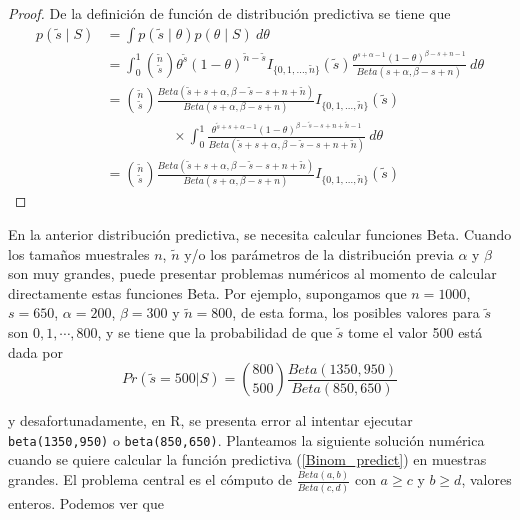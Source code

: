     \begin{proof}
    De la definici\'on de funci\'on de distribuci\'on predictiva se tiene que
    \begin{align*}
    p(\tilde{s} \mid S)&=\int p(\tilde{s} \mid \theta)p(\theta \mid S)\ d\theta\\
    &=\int_0^1 \binom{\tilde{n}}{\tilde{s}} \theta^{\tilde{s}}(1-\theta)^{\tilde{n}-\tilde{s}}I_{\{0,1,\ldots,\tilde{n}\}}(\tilde{s})
    \frac{\theta^{s+\alpha-1}(1-\theta)^{\beta-s+n-1}}{Beta(s+\alpha,\beta-s+n)}\ d\theta\\
    &=\binom{\tilde{n}}{\tilde{s}}\frac{Beta(\tilde{s}+s+\alpha,\beta-\tilde{s}-s+n+\tilde{n})}{Beta(s+\alpha,\beta-s+n)}I_{\{0,1,\ldots,\tilde{n}\}}(\tilde{s})\\
    & \hspace{2cm}\times
    \int_0^1\frac{\theta^{\tilde{s}+s+\alpha-1}(1-\theta)^{\beta-\tilde{s}-s+n+\tilde{n}-1}}
    {Beta(\tilde{s}+s+\alpha,\beta-\tilde{s}-s+n+\tilde{n})}\ d\theta\\
    &=\binom{\tilde{n}}{\tilde{s}}\frac{Beta(\tilde{s}+s+\alpha,\beta-\tilde{s}-s+n+\tilde{n})}{Beta(s+\alpha,\beta-s+n)}I_{\{0,1,\ldots,\tilde{n}\}}(\tilde{s})
    \end{align*}
    \end{proof}
    
    En la anterior distribuci\'on predictiva, se necesita calcular funciones Beta. Cuando los tama\~nos muestrales $n$, $\tilde{n}$ y/o los par\'ametros de la distribuci\'on previa $\alpha$ y $\beta$ son muy grandes, puede presentar problemas num\'ericos al momento de calcular directamente estas funciones Beta. Por ejemplo, supongamos que $n=1000$, $s=650$, $\alpha=200$, $\beta=300$ y $\tilde{n}=800$, de esta forma, los posibles valores para $\tilde{s}$ son $0,1,\cdots,800$, y se tiene que la probabilidad de que $\tilde{s}$ tome el valor 500 est\'a dada por
    \begin{equation}\label{Eje_binom}
    Pr(\tilde{s}=500|S)=\binom{800}{500}\frac{Beta(1350,950)}{Beta(850,650)}
    \end{equation}
    
    y desafortunadamente, en \textsf{R}, se presenta error al intentar ejecutar \texttt{beta(1350,950)} o \texttt{beta(850,650)}. Planteamos la siguiente soluci\'on num\'erica cuando se quiere calcular la funci\'on predictiva (\ref{Binom_predict}) en muestras grandes. El problema central es el c\'omputo de $\frac{Beta(a,b)}{Beta(c,d)}$ con $a\geq c$ y $b\geq d$, valores enteros. Podemos ver que
    
